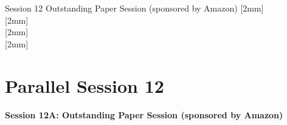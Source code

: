 \clearpage
{}
\begin{OneSessionOverview}{Session 12}{\daydateyear}
  {Outstanding Paper Session (sponsored by Amazon)}
  [2mm]
  \\
  \hline
  [2mm]
  \\
  \hline
  [2mm]
  \\
  \hline
  [2mm]
  \\
\end{OneSessionOverview}

\newpage
\section*{Parallel Session 12}
{\bfseries\large Session 12A: Outstanding Paper Session (sponsored by Amazon)}\\
\TrackALoc\hfill{}
\clearpage



